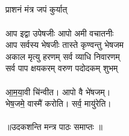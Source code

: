 \subsection{}
प्राशनं मंत्र जपं कुर्यात् \\
\\
आप इद्वा उपेषजीः आपो अमी वचातनीः \\
आप सर्वस्य भेषजीः तास्ते कृण्वन्तु भेषजम \\
अकाल मृत्यु हरणम् सर्व व्याधि निवारणम् \\
सर्व पाप क्षयकरम् वरुण पदोदकम् शुभम् \\
\\
आ॒म॒या॒वी चि॑न्वीत। आपो वै भे॑षजम्। \\
भेष॒जमे॒ वास्मै॑ करोति। सर्व॒ मायु॑रेति। \\
\\
॥उदकशन्ति मन्त्र पाठः समाप्तः ॥\\
